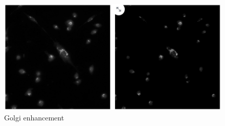 \begin{figure}[htb]
	\begin{center}
		\includegraphics[width=0.5\linewidth]{bilder/enhancement.jpg}
		\caption{Golgi enhancement}\label{fig:golgi-enhancement}
	\end{center}
\end{figure}